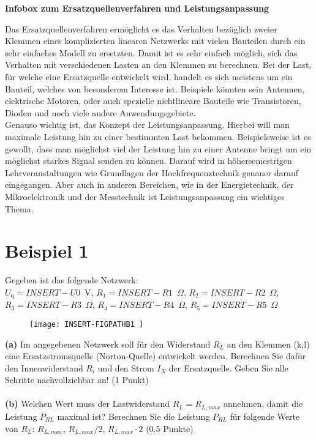 \begin{boxed2}
    \begin{center}
     \textbf{Infobox zum Ersatzquellenverfahren und Leistungsanpassung}
    \end{center}
    Das Ersatzquellenverfahren erm\"oglicht es das Verhalten bez\"uglich zweier Klemmen eines komplizierten linearen Netzwerks mit vielen Bauteilen durch ein sehr einfaches Modell zu ersetzten. 
    Damit ist es sehr einfach m\"oglich, sich das Verhalten mit verschiedenen Lasten an den Klemmen zu berechnen. 
    Bei der Last, f\"ur welche eine Ersatzquelle entwickelt wird, handelt es sich meistens um ein Bauteil, welches von besonderem Interesse ist. 
    Beispiele k\"onnten sein Antennen, elektrische Motoren, oder auch spezielle nichtlineare Bauteile wie Transistoren, Dioden und noch viele andere Anwendungsgebiete.
    \\
    Genauso wichtig ist, das Konzept der Leistungsanpassung. Hierbei will man maximale Leistung hin zu einer bestimmten Last bekommen. 
    Beispielsweise ist es gewollt, dass man m\"oglichst viel der Leistung hin zu einer Antenne bringt um ein m\"oglichst starkes Signal senden zu k\"onnen. 
    Darauf wird in h\"ohersemestrigen Lehrveranstaltungen wie Grundlagen der Hochfrequenztechnik genauer darauf eingegangen.
    Aber auch in anderen Bereichen, wie in der Energietechnik, der Mikroelektronik und der Messtechnik ist Leistungsanpassung ein wichtiges Thema.
\end{boxed2}


\newpage
\section*{Beispiel 1}    
Gegeben ist das folgende Netzwerk:\\

$U_{\mathrm{q}} = INSERT-U0 $~V, $R_1 = INSERT-R1 $~$\Omega$, $R_2 = INSERT-R2 $~$\Omega$, $R_3 = INSERT-R3 $~$\Omega$, $R_4 = INSERT-R4 $~$\Omega$, $R_5 = INSERT-R5 $~$\Omega$\\

\FloatBarrier
	\begin{figure}[h]
        \centering
        \def\svgwidth{300pt}
        \texttt{[image:  INSERT-FIGPATHB1 ]}\\
    \end{figure}
\FloatBarrier

\textbf{(a)} Im angegebenen Netzwerk soll f\"ur den Widerstand $R_L$ an den Klemmen (k,l) eine Ersatzstromsquelle (Norton-Quelle) entwickelt werden. Berechnen Sie daf\"ur den Innenwiderstand $R_i$ und den Strom $I_N$ der Ersatzquelle. Geben Sie alle Schritte nachvollziehbar an! (1 Punkt)\\
\\
\textbf{(b)} Welchen Wert muss der Lastwiderstand $R_L=R_{L,max}$ annehmen, damit die Leistung $P_{RL}$ maximal ist? Berechnen Sie die Leistung $P_{RL}$ f\"ur folgende Werte von $R_L$: $R_{L,max}$, $R_{L,max}/2$, $R_{L,max}\cdot2$  (0.5 Punkte)\\

